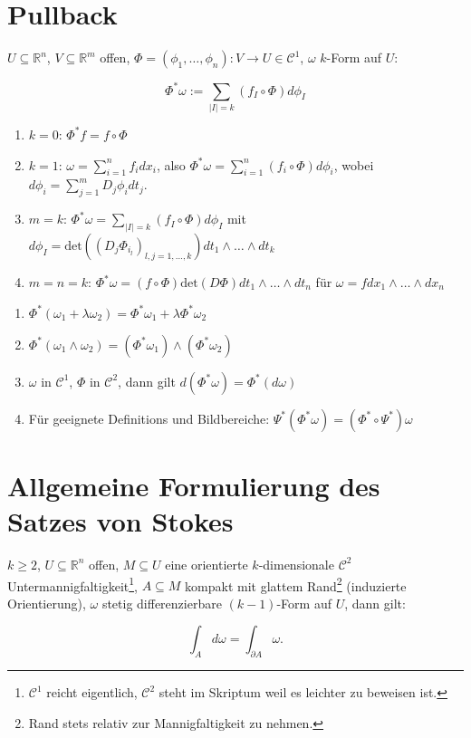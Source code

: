 \section{Pullback}
\begin{definition}[Pullback]
	$U\subseteq\mathbb R^n$, $V\subseteq\mathbb R^m$ offen, $\Phi = (\phi_1,\dots,\phi_n):V\rightarrow U \in \mathcal C^1$, $\omega$ $k$-Form auf $U$:

$$\Phi^*\omega := \sum_{|I|=k} (f_I\circ\Phi)d\phi_I$$
\end{definition}
\begin{remark}\leavevmode
	\begin{enumerate}
		\item $k=0$: $\Phi^*f = f\circ\Phi$
		\item $k=1$: $\omega = \sum_{i=1}^n f_i dx_i$, also $\Phi^*\omega = \sum_{i=1}^n (f_i\circ\Phi) d\phi_i$, wobei $d\phi_i = \sum_{j=1}^m D_j\phi_i dt_j$.
		\item $m=k$: $\Phi^*\omega = \sum_{|I|=k}(f_I\circ \Phi)d\phi_I$ mit $d\phi_I = \text{det}((D_j\Phi_{i_l})_{l,j=1,\dots,k})dt_1\wedge\dots\wedge dt_k$
		\item $m=n=k$: $\Phi^*\omega = (f\circ\Phi)\text{det}(D\Phi)dt_1\wedge\dots\wedge dt_n$ f\"ur $\omega = fdx_1\wedge\dots\wedge dx_n$
	\end{enumerate}
\end{remark}

\begin{theorem}\leavevmode
	\begin{enumerate}
		\item $\Phi^*(\omega_1+\lambda\omega_2) = \Phi^*\omega_1 + \lambda\Phi^*\omega_2$
		\item $\Phi^*(\omega_1\wedge\omega_2) = (\Phi^*\omega_1)\wedge(\Phi^*\omega_2)$
		\item $\omega$ in $\mathcal C^1$, $\Phi$ in $\mathcal C^2$, dann gilt $d(\Phi^*\omega)=\Phi^*(d\omega)$
		\item F\"ur geeignete Definitions und Bildbereiche: $\Psi^*(\Phi^*\omega)=(\Phi^*\circ\Psi^*)\omega$
	\end{enumerate}
\end{theorem}






\section{Allgemeine Formulierung des Satzes von Stokes}
\begin{theorem}
	$k\geq 2$, $U\subseteq\mathbb R^n$ offen, $M\subseteq U$ eine orientierte $k$-dimensionale $\mathcal C^2$ Untermannigfaltigkeit\footnote{$\mathcal C^1$ reicht eigentlich, $\mathcal C^2$ steht im Skriptum weil es leichter zu beweisen ist.}, $A\subseteq M$ kompakt mit glattem Rand\footnote{Rand stets relativ zur Mannigfaltigkeit zu nehmen.} (induzierte Orientierung), $\omega$ stetig differenzierbare $(k-1)$-Form auf $U$, dann gilt:
	
	$$\int_A d\omega = \int_{\partial A} \omega.$$
\end{theorem}


